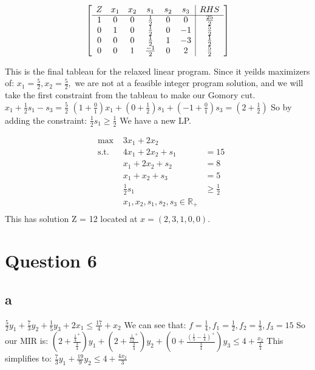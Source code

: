 \documentclass[10pt, letterpaper]{paper}
\begin{document}
\[
	\left[ {\begin{array}{cccccc|c}
	Z & x_1 & x_2 & s_1 & s_2 & s_3 &  RHS\\ \cline{1-7}
	1 & 0 & 0 & \frac{1}{2} & 0 & 0  &\frac{25}{2} \\
	0 & 1 & 0 & \frac{1}{2} & 0 & -1 & \frac{5}{2} \\
	0 & 0 & 0 & \frac{1}{2} & 1 & -3 & \frac{1}{2} \\
	0 & 0 & 1 & \frac{-1}{2} & 0 & 2 & \frac{5}{2}  \\
	\end{array} } \right]
\]

This is the final tableau for the relaxed linear program. Since it yeilds maximizers of:
$x_1 = \frac{5}{2}, x_2 = \frac{5}{2},$ we are not at a feasible integer program solution, and we will take the first constraint from the tableau to make our Gomory cut.
\newline
$x_1 + \frac{1}{2} s_1 - s_3 = \frac{5}{2}$
\newline
$(1+\frac{0}{1})x_1 + (0 + \frac{1}{2})s_1 + (-1 + \frac{0}{1})s_3 = (2 + \frac{1}{2})$
\newline
So by adding the constraint: $\frac{1}{2} s_1 \geq \frac{1}{2}$ We have a new LP.

\begin{equation*}
\begin{alignedat}{3}
&\text{max }&3x_1 + 2x_2&\\
&\text{s.t. } &4x_1 +2x_2 + s_1&= 15\\
& &x_1 + 2x_2 + s_2  &= 8\\
& &x_1 + x_2 + s_3 &= 5\\
& &\frac{1}{2} s_1 &\geq \frac{1}{2}\\
& &x_1,x_2,s_1,s_2,s_3 \in \mathbb{R}_+ &\\
\end{alignedat}
\end{equation*}
This has solution Z = 12 located at $x = (2,3,1,0,0)$.

\section*{Question 6}
\subsection*{a}
$\frac{5}{2} y_1 + \frac{7}{3} y_2 + \frac{1}{5} y_3 + 2x_1 \leq \frac{17}{4} + x_2$
\newline
We can see that: $f = \frac{1}{4}, f_1 = \frac{1}{2}, f_2 = \frac{1}{3}, f_3 = {1}{5}$
\newline
So our MIR is: $(2+\frac{\frac{1}{4}^+}{\frac{3}{4}})y_1 + (2+\frac{\frac{1}{12}^+}{\frac{3}{4}})y_2 + (0 + \frac{(\frac{1}{5} -\frac{1}{4})^+}{\frac{3}{4}})y_3 \leq 4 + \frac{x_2}{\frac{3}{4}}$
\newline
This simplifies to: $\frac{7}{3} y_1 + \frac{19}{9} y_2 \leq 4 + \frac{4x_2}{3}$
\end{document}
